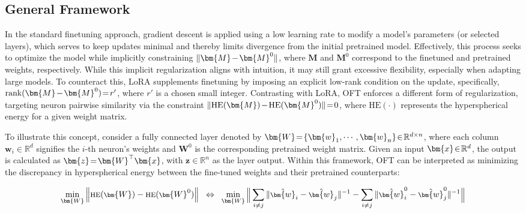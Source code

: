\subsection{General Framework}

In the standard finetuning approach, gradient descent is applied using a low learning rate to modify a model's parameters (or selected layers), which serves to keep updates minimal and thereby limits divergence from the initial pretrained model. Effectively, this process seeks to optimize the model while implicitly constraining $\thickmuskip=2mu \medmuskip=2mu \| \bm{M} - \bm{M}^0\|$, where $\bm{M}$ and $\bm{M}^0$ correspond to the finetuned and pretrained weights, respectively. While this implicit regularization aligns with intuition, it may still grant excessive flexibility, especially when adapting large models. To counteract this, LoRA supplements finetuning by imposing an explicit low-rank condition on the update, specifically, $\thickmuskip=2mu \medmuskip=2mu \text{rank}(\bm{M} - \bm{M}^0)=r'$, where $r'$ is a chosen small integer. Contrasting with LoRA, OFT enforces a different form of regularization, targeting neuron pairwise similarity via the constraint $\thickmuskip=2mu \medmuskip=2mu \| \text{HE}(\bm{M})-\text{HE}(\bm{M}^0) \|=0$, where $\text{HE}(\cdot)$ represents the hyperspherical energy for a given weight matrix. 

To illustrate this concept, consider a fully connected layer denoted by $\thickmuskip=2mu \medmuskip=2mu \bm{W}=\{\bm{w}_1,\cdots,\bm{w}_n\}\in\mathbb{R}^{d\times n}$, where each column $\bm{w}_i\in\mathbb{R}^{d}$ signifies the $i$-th neuron's weights and $\bm{W}^0$ is the corresponding pretrained weight matrix. Given an input $\thickmuskip=2mu \medmuskip=2mu \bm{x}\in\mathbb{R}^d$, the output is calculated as $\thickmuskip=2mu \medmuskip=2mu \bm{z}=\bm{W}^\top\bm{x}$, with $\bm{z}\in\mathbb{R}^n$ as the layer output. Within this framework, OFT can be interpreted as minimizing the discrepancy in hyperspherical energy between the fine-tuned weights and their pretrained counterparts:

\begin{equation}\label{eq:oft_principle}
\footnotesize
\min_{\bm{W}} \left\| \text{HE}(\bm{W})-\text{HE}(\bm{W}^0)\right\|~~\Leftrightarrow~~\min_{\bm{W}} \bigg{\|} \sum_{i\neq j} \|\hat{\bm{w}}_i-\hat{\bm{w}}_j\|^{-1}-\sum_{i\neq j} \|\hat{\bm{w}}^0_i-\hat{\bm{w}}^0_j\|^{-1}\bigg{\|}
\end{equation}

